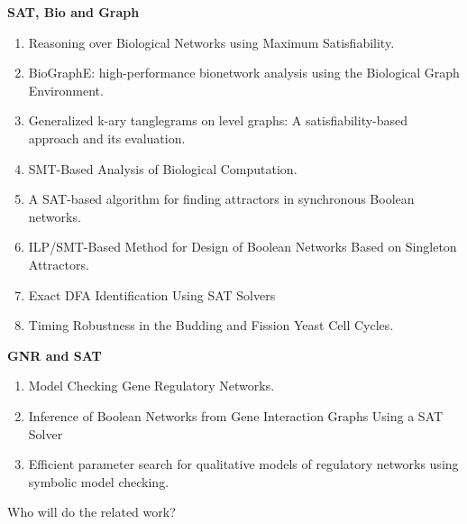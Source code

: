 

\textbf{SAT, Bio and Graph}
\begin{enumerate}
\item Reasoning over Biological Networks using Maximum Satisfiability.
\item BioGraphE: high-performance bionetwork analysis using the Biological Graph Environment.
\item Generalized k-ary tanglegrams on level graphs: A satisfiability-based approach and its evaluation.
\item SMT-Based Analysis of Biological Computation.
\item A SAT-based algorithm for finding attractors in synchronous Boolean networks.
\item ILP/SMT-Based Method for Design of Boolean Networks Based on Singleton Attractors.
\item Exact DFA Identification Using SAT Solvers
\item Timing Robustness in the Budding and Fission Yeast Cell Cycles.
\end{enumerate}

\textbf{GNR and SAT}
\begin{enumerate}
\item Model Checking Gene Regulatory Networks.
\item Inference of Boolean Networks from Gene Interaction Graphs Using a SAT Solver
\item Efficient parameter search for qualitative models of regulatory networks using symbolic model checking.
\end{enumerate}

Who will do the related work?


